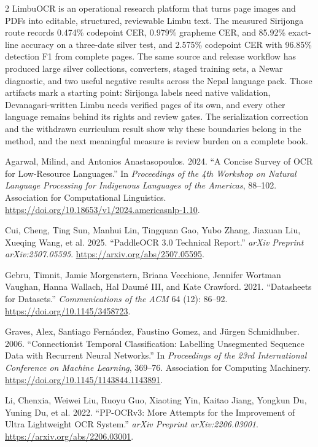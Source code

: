\documentclass[
  10pt,
]{article}
\newlength{\cslhangindent}
\newenvironment{CSLReferences}[2] %
 {\begin{list}{}{%
  \setlength{\itemindent}{0pt}
  \setlength{\leftmargin}{0pt}
  \setlength{\parsep}{0pt}
  \ifodd #1
   \setlength{\leftmargin}{\cslhangindent}
   \setlength{\itemindent}{-1\cslhangindent}
  \fi
  \setlength{\itemsep}{#2\baselineskip}}}
 {\end{list}}
\begin{document}
\begin{multicols}{2}
LimbuOCR is an operational research platform that turns page images and
PDFs into editable, structured, reviewable Limbu text. The measured
Sirijonga route records 0.474\% codepoint CER, 0.979\% grapheme CER, and
85.92\% exact-line accuracy on a three-date silver test, and 2.575\%
codepoint CER with 96.85\% detection F1 from complete pages. The same
source and release workflow has produced large silver collections,
converters, staged training sets, a Newar diagnostic, and two useful
negative results across the Nepal language pack. Those artifacts mark a
starting point: Sirijonga labels need native validation,
Devanagari-written Limbu needs verified pages of its own, and every
other language remains behind its rights and review gates. The
serialization correction and the withdrawn curriculum result show why
these boundaries belong in the method, and the next meaningful measure
is review burden on a complete book.

\label{refs}
\begin{CSLReferences}{1}{0}
Agarwal, Milind, and Antonios Anastasopoulos. 2024. {``A Concise Survey
of {OCR} for Low-Resource Languages.''} In \emph{Proceedings of the 4th
Workshop on Natural Language Processing for Indigenous Languages of the
Americas}, 88--102. Association for Computational Linguistics.
\url{https://doi.org/10.18653/v1/2024.americasnlp-1.10}.

Cui, Cheng, Ting Sun, Manhui Lin, Tingquan Gao, Yubo Zhang, Jiaxuan Liu,
Xueqing Wang, et al. 2025. {``{PaddleOCR 3.0} Technical Report.''}
\emph{arXiv Preprint arXiv:2507.05595}.
\url{https://arxiv.org/abs/2507.05595}.

Gebru, Timnit, Jamie Morgenstern, Briana Vecchione, Jennifer Wortman
Vaughan, Hanna Wallach, Hal Daumé III, and Kate Crawford. 2021.
{``Datasheets for Datasets.''} \emph{Communications of the ACM} 64 (12):
86--92. \url{https://doi.org/10.1145/3458723}.

Graves, Alex, Santiago Fernández, Faustino Gomez, and Jürgen
Schmidhuber. 2006. {``Connectionist Temporal Classification: Labelling
Unsegmented Sequence Data with Recurrent Neural Networks.''} In
\emph{Proceedings of the 23rd International Conference on Machine
Learning}, 369--76. Association for Computing Machinery.
\url{https://doi.org/10.1145/1143844.1143891}.

Li, Chenxia, Weiwei Liu, Ruoyu Guo, Xiaoting Yin, Kaitao Jiang, Yongkun
Du, Yuning Du, et al. 2022. {``{PP-OCRv3}: More Attempts for the
Improvement of Ultra Lightweight OCR System.''} \emph{arXiv Preprint
arXiv:2206.03001}. \url{https://arxiv.org/abs/2206.03001}.


\end{CSLReferences}
\end{multicols}
\end{document}
